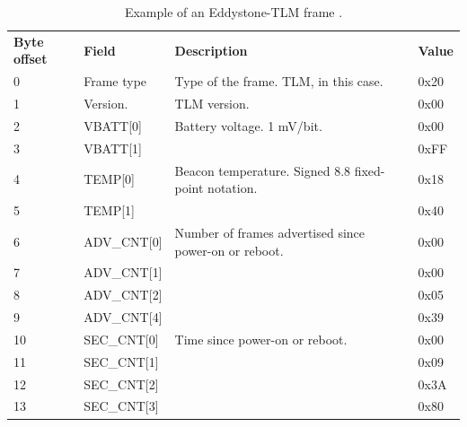 \begin{table}[h!]
\centering
\caption{Example of an Eddystone-TLM frame \cite{eddystone:protocol-tlm-spec}.}
\label{tbl:design:ble-positioning:eddystone-tlm}
\begin{tabular}{llll}
\textbf{Byte offset} & \textbf{Field}  & \textbf{Description}                                                        & \textbf{Value} \\
0                    & Frame type      & Type of the frame. TLM, in this case.                                       & 0x20           \\
1                    & Version.        & TLM version.                                                                & 0x00           \\
2                    & VBATT{[}0{]}    & Battery voltage. 1 mV/bit.                                                  & 0x00           \\
3                    & VBATT{[}1{]}    &                                                                             & 0xFF           \\
4                    & TEMP{[}0{]}     & Beacon temperature. Signed 8.8 fixed-point notation. & 0x18           \\
5                    & TEMP{[}1{]}     &                                                                             & 0x40           \\
6                    & ADV\_CNT{[}0{]} & Number of frames advertised since power-on or reboot.                        & 0x00           \\
7                    & ADV\_CNT{[}1{]} &                                                                             & 0x00           \\
8                    & ADV\_CNT{[}2{]} &                                                                             & 0x05           \\
9                    & ADV\_CNT{[}4{]} &                                                                             & 0x39           \\
10                   & SEC\_CNT{[}0{]} & Time since power-on or reboot.                                               & 0x00           \\
11                   & SEC\_CNT{[}1{]} &                                                                             & 0x09           \\
12                   & SEC\_CNT{[}2{]} &                                                                             & 0x3A           \\
13                   & SEC\_CNT{[}3{]} &                                                                             & 0x80          
\end{tabular}
\end{table}

